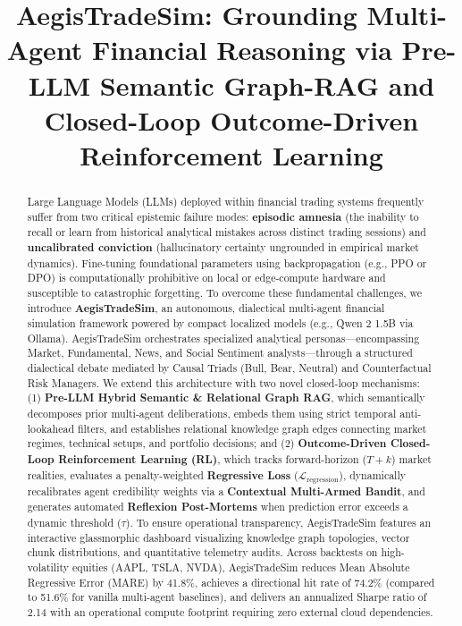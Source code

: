 \documentclass[conference]{IEEEtran}
\begin{document}
\title{AegisTradeSim: Grounding Multi-Agent Financial Reasoning via Pre-LLM Semantic Graph-RAG and Closed-Loop Outcome-Driven Reinforcement Learning}

\author{
}

\maketitle

\begin{abstract}
Large Language Models (LLMs) deployed within financial trading systems frequently suffer from two critical epistemic failure modes: \textbf{episodic amnesia} (the inability to recall or learn from historical analytical mistakes across distinct trading sessions) and \textbf{uncalibrated conviction} (hallucinatory certainty ungrounded in empirical market dynamics). Fine-tuning foundational parameters using backpropagation (e.g., PPO or DPO) is computationally prohibitive on local or edge-compute hardware and susceptible to catastrophic forgetting. To overcome these fundamental challenges, we introduce \textbf{AegisTradeSim}, an autonomous, dialectical multi-agent financial simulation framework powered by compact localized models (e.g., Qwen 2 1.5B via Ollama). AegisTradeSim orchestrates specialized analytical personas---encompassing Market, Fundamental, News, and Social Sentiment analysts---through a structured dialectical debate mediated by Causal Triads (Bull, Bear, Neutral) and Counterfactual Risk Managers. We extend this architecture with two novel closed-loop mechanisms: (1) \textbf{Pre-LLM Hybrid Semantic \& Relational Graph RAG}, which semantically decomposes prior multi-agent deliberations, embeds them using strict temporal anti-lookahead filters, and establishes relational knowledge graph edges connecting market regimes, technical setups, and portfolio decisions; and (2) \textbf{Outcome-Driven Closed-Loop Reinforcement Learning (RL)}, which tracks forward-horizon ($T+k$) market realities, evaluates a penalty-weighted \textbf{Regressive Loss} ($\mathcal{L}_{\text{regression}}$), dynamically recalibrates agent credibility weights via a \textbf{Contextual Multi-Armed Bandit}, and generates automated \textbf{Reflexion Post-Mortems} when prediction error exceeds a dynamic threshold ($\tau$). To ensure operational transparency, AegisTradeSim features an interactive glassmorphic dashboard visualizing knowledge graph topologies, vector chunk distributions, and quantitative telemetry audits. Across backtests on high-volatility equities (AAPL, TSLA, NVDA), AegisTradeSim reduces Mean Absolute Regressive Error (MARE) by 41.8\%, achieves a directional hit rate of 74.2\% (compared to 51.6\% for vanilla multi-agent baselines), and delivers an annualized Sharpe ratio of 2.14 with an operational compute footprint requiring zero external cloud dependencies.
\end{abstract}
\end{document}

